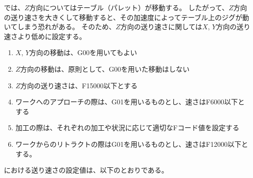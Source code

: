 \DMC では、$Z$方向についてはテーブル（パレット）が移動する。
したがって、$Z$方向の送り速さを大きくして移動すると、その加速度によってテーブル上のジグが動いてしまう恐れがある。
そのため、$Z$方向の送り速さに関しては$X$, $Y$方向の送り速さより低めに設定する。
\begin{enumerate}[label=\Roman*., ref=\Roman*]
\item $X$, $Y$方向の移動は、{\ttfamily G00}を用いてもよい
\item $Z$方向の移動は、原則として、{\ttfamily G00}を用いた移動はしない
\item $Z$方向の送り速さは、{\ttfamily F15000}以下とする
\item {}ワークへのアプローチの際は、{\ttfamily G01}を用いるものとし、速さは{\ttfamily F6000}以下とする
\item 加工の際は、それぞれの加工や状況に応じて適切なFコード値を設定する
\item ワークからのリトラクトの際は{\ttfamily G01}を用いるものとし、速さは{\ttfamily F12000}以下とする。
\end{enumerate}


\clearpage
\noindent
\dateKouguSpeed における送り速さの設定値は、以下のとおりである。\\

